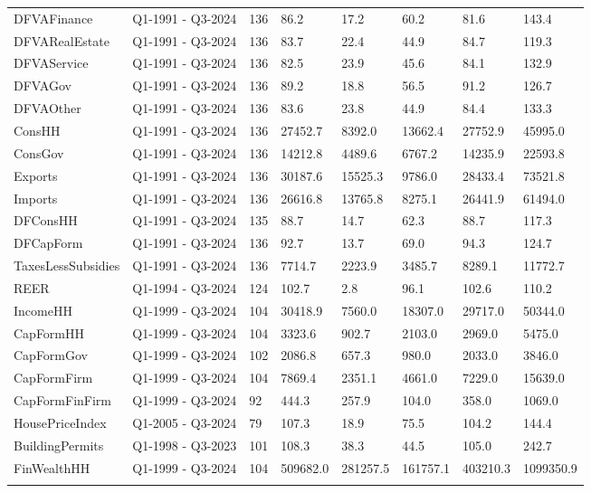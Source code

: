 \begin{longtable}[t]{llllllll}
DFVAFinance & Q1-1991 - Q3-2024 & 136 & 86.2 & 17.2 & 60.2 & 81.6 & 143.4\\
\addlinespace
DFVARealEstate & Q1-1991 - Q3-2024 & 136 & 83.7 & 22.4 & 44.9 & 84.7 & 119.3\\
DFVAService & Q1-1991 - Q3-2024 & 136 & 82.5 & 23.9 & 45.6 & 84.1 & 132.9\\
DFVAGov & Q1-1991 - Q3-2024 & 136 & 89.2 & 18.8 & 56.5 & 91.2 & 126.7\\
DFVAOther & Q1-1991 - Q3-2024 & 136 & 83.6 & 23.8 & 44.9 & 84.4 & 133.3\\
ConsHH & Q1-1991 - Q3-2024 & 136 & 27452.7 & 8392.0 & 13662.4 & 27752.9 & 45995.0\\
\addlinespace
ConsGov & Q1-1991 - Q3-2024 & 136 & 14212.8 & 4489.6 & 6767.2 & 14235.9 & 22593.8\\
Exports & Q1-1991 - Q3-2024 & 136 & 30187.6 & 15525.3 & 9786.0 & 28433.4 & 73521.8\\
Imports & Q1-1991 - Q3-2024 & 136 & 26616.8 & 13765.8 & 8275.1 & 26441.9 & 61494.0\\
DFConsHH & Q1-1991 - Q3-2024 & 135 & 88.7 & 14.7 & 62.3 & 88.7 & 117.3\\
DFCapForm & Q1-1991 - Q3-2024 & 136 & 92.7 & 13.7 & 69.0 & 94.3 & 124.7\\
\addlinespace
TaxesLessSubsidies & Q1-1991 - Q3-2024 & 136 & 7714.7 & 2223.9 & 3485.7 & 8289.1 & 11772.7\\
REER & Q1-1994 - Q3-2024 & 124 & 102.7 & 2.8 & 96.1 & 102.6 & 110.2\\
IncomeHH & Q1-1999 - Q3-2024 & 104 & 30418.9 & 7560.0 & 18307.0 & 29717.0 & 50344.0\\
CapFormHH & Q1-1999 - Q3-2024 & 104 & 3323.6 & 902.7 & 2103.0 & 2969.0 & 5475.0\\
CapFormGov & Q1-1999 - Q3-2024 & 102 & 2086.8 & 657.3 & 980.0 & 2033.0 & 3846.0\\
\addlinespace
CapFormFirm & Q1-1999 - Q3-2024 & 104 & 7869.4 & 2351.1 & 4661.0 & 7229.0 & 15639.0\\
CapFormFinFirm & Q1-1999 - Q3-2024 & 92 & 444.3 & 257.9 & 104.0 & 358.0 & 1069.0\\
HousePriceIndex & Q1-2005 - Q3-2024 & 79 & 107.3 & 18.9 & 75.5 & 104.2 & 144.4\\
BuildingPermits & Q1-1998 - Q3-2023 & 101 & 108.3 & 38.3 & 44.5 & 105.0 & 242.7\\
FinWealthHH & Q1-1999 - Q3-2024 & 104 & 509682.0 & 281257.5 & 161757.1 & 403210.3 & 1099350.9\\
\addlinespace

\end{longtable}
